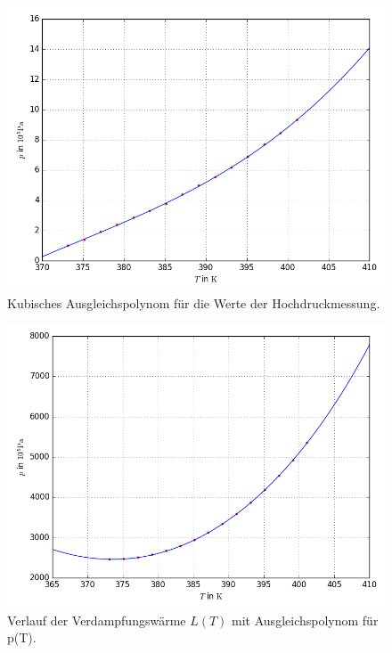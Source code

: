 \begin{figure}
  \centering
  \includegraphics[width=\textwidth]{poly.png}
  \caption{Kubisches Ausgleichspolynom für die Werte der Hochdruckmessung.}
  \label{fig:pol}
\end{figure}

\begin{figure}
  \centering
  \includegraphics[width=\textwidth]{L(T).png}
  \caption{Verlauf der Verdampfungswärme $L(T)$ mit Ausgleichspolynom für p(T).}
  \label{fig:pol}
\end{figure}